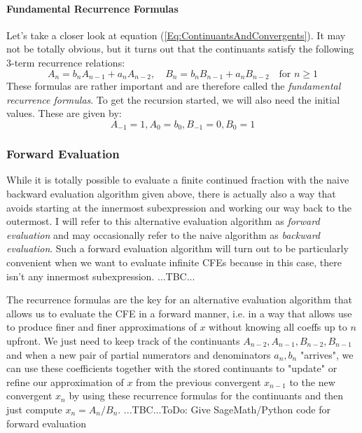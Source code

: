 \paragraph{Fundamental Recurrence Formulas}
Let's take a closer look at equation (\ref{Eq:ContinuantsAndConvergents}). It may not be totally obvious, but it turns out that the continuants satisfy the following 3-term recurrence relations:
\begin{equation}
A_n = b_n A_{n-1} + a_n A_{n-2}, \quad
B_n = b_n B_{n-1} + a_n B_{n-2}  \quad
\text{for }  n \geq 1
\end{equation}
These formulas are rather important and are therefore called the \emph{fundamental recurrence formulas}.
To get the recursion started, we will also need the initial values. These are given by:
\begin{equation}
A_{-1} = 1, A_0 = b_0, B_{-1} = 0, B_0 = 1
\end{equation}




\subsubsection{Forward Evaluation}
While it is totally possible to evaluate a finite continued fraction with the naive backward evaluation algorithm given above, there is actually also a way that avoids starting at the innermost subexpression and working our way back to the outermost. I will refer to this alternative evaluation algorithm as \emph{forward evaluation} and may occasionally refer to the naive algorithm as \emph{backward evaluation}. Such a forward evaluation algorithm will turn out to be particularly convenient when we want to evaluate infinite CFEs because in this case, there isn't any innermost subexpression. ...TBC...





The recurrence formulas are the key for an alternative evaluation algorithm that allows us to evaluate the CFE in a forward manner, i.e. in a way that allows use to produce finer and finer approximations of $x$ without knowing all coeffs up to $n$ upfront. We just need to keep track of the continuants $A_{n-2}, A_{n-1}, B_{n-2}, B_{n-1}$ and when a new pair of partial numerators and denominators $a_n, b_n$ "arrives", we can use these coefficients together with the stored continuants to "update" or refine our approximation of $x$ from the previous convergent $x_{n-1}$ to the new convergent $x_n$ by using these recurrence formulas for the continuants and then just compute $x_n = A_n/B_n$. ...TBC...ToDo: Give SageMath/Python code for forward evaluation


